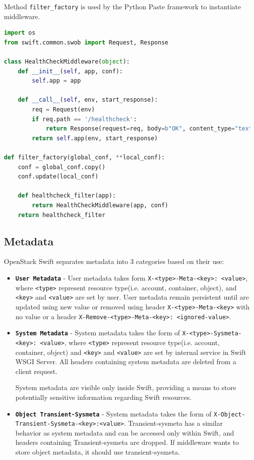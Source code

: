     Method \texttt{filter\_factory} is used by the Python Paste framework to instantiate middleware.

\begin{lstlisting}[language=Python, style=pythonStyle, caption=Example of healthcheck middleware in OpenStack Swift, label=lst:swift-healthcheck]
import os
from swift.common.swob import Request, Response

class HealthCheckMiddleware(object):
    def __init__(self, app, conf):
        self.app = app

    def __call__(self, env, start_response):
        req = Request(env)
        if req.path == '/healthcheck':
            return Response(request=req, body=b"OK", content_type="text/plain")(env, start_response)
        return self.app(env, start_response)

def filter_factory(global_conf, **local_conf):
    conf = global_conf.copy()
    conf.update(local_conf)

    def healthcheck_filter(app):
        return HealthCheckMiddleware(app, conf)
    return healthcheck_filter
\end{lstlisting}

    \subsection{Metadata}
    OpenStack Swift separates metadata into 3 categories based on their use:
    \begin{itemize}
        \item \textbf{\texttt{User Metadata}} - User metadata takes form \texttt{X-<type>-Meta-<key>: <value>}, where \texttt{<type>} represent resource type(i.e. account, container, object), and \texttt{<key>} and \texttt{<value>} are set by user. User metadata remain persistent until are updated using new value or removed using header \texttt{X-<type>-Meta-<key>} with no value or a header \texttt{X-Remove-<type>-Meta-<key>: <ignored-value>}.
        \item \textbf{\texttt{System Metadata}} - System metadata takes the form of \texttt{X-<type>-Sysmeta-<key>: <value>}, where \texttt{<type>} represent resource type(i.e. account, container, object) and \texttt{<key>} and \texttt{<value>} are set by internal service in Swift WSGI Server.
        All headers containing system metadata are deleted from a client request.

        System metadata are visible only inside Swift, providing a means to store potentially sensitive information regarding Swift resources.
        \item \textbf{\texttt{Object Transient-Sysmeta}} - System metadata takes the form of \texttt{\newline X-Object-Transient-Sysmeta-<key>:<value>}. Transient-sysmeta has a similar behavior as system metadata and can be accessed only within Swift, and headers containing Transient-sysmeta are dropped. If middleware wants to store object metadata, it should use transient-sysmeta\cite{swiftMiddleware}.
    \end{itemize}

